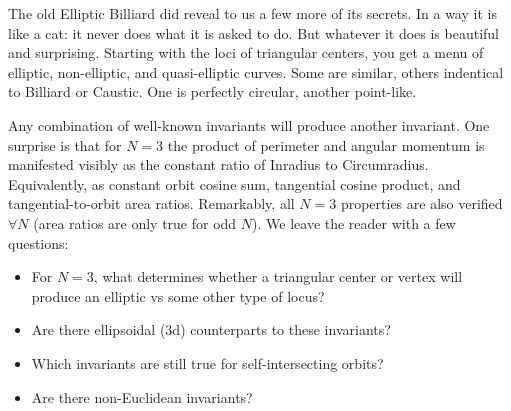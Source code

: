 The old Elliptic Billiard did reveal to us a few more of its secrets. In a way it is like a cat: it never does what it is asked to do. But whatever it does is beautiful and surprising. Starting with the loci of triangular centers, you get a menu of elliptic, non-elliptic, and quasi-elliptic curves. Some are similar, others indentical to Billiard or Caustic. One is perfectly circular, another point-like.

Any combination of well-known invariants will produce another invariant. One surprise is that for $N=3$ the product of perimeter and angular momentum is manifested visibly as the constant ratio of Inradius to Circumradius. Equivalently, as constant orbit cosine sum, tangential cosine product, and tangential-to-orbit area ratios. Remarkably, all $N=3$ properties are also verified $\forall{N}$ (area ratios are only true for odd $N$). We leave the reader with a few questions:

\begin{itemize}
    \item For $N=3$, what determines whether a triangular center or vertex will produce an elliptic vs some other type of locus?
    \item Are there ellipsoidal (3d) counterparts to these invariants?
    \item Which invariants are still true for self-intersecting orbits?
    \item Are there non-Euclidean invariants?
\end{itemize}